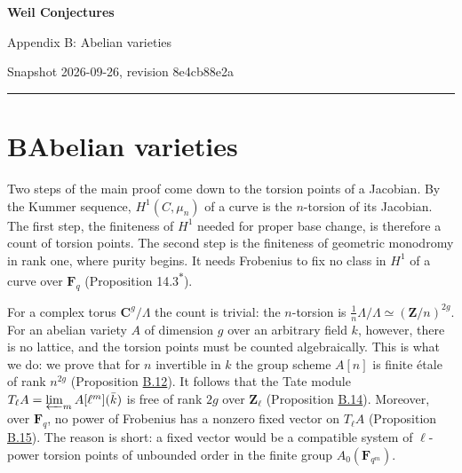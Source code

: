 \documentclass[11pt]{article}
\newcommand{\bpout}[1]{#1\textsuperscript{\hyperlink{bp-outside}{\ensuremath{\ast}}}}
\begin{document}
\pagestyle{plain}
\begin{center}
{\LARGE\bfseries Weil Conjectures\par}
\vspace{0.7em}
{\large Appendix B: Abelian varieties\par}
\vspace{0.5em}
{\small\color{bpmuted}Snapshot 2026-09-26, revision 8e4cb88e2a\par}
\end{center}
\vspace{0.5em}
{\small\tableofcontents}
\bigskip\hrule\bigskip

\section*{\texorpdfstring{B\quad Abelian varieties}{B Abelian varieties}}
\label{bp1}%
\label{bp2}%
Two steps of the main proof come down to the torsion points of a Jacobian. By the Kummer sequence, \(H^1(C,\mu_n)\) of a curve is the \(n\)-torsion of its Jacobian. The first step, the finiteness of \(H^1\) needed for proper base change, is therefore a count of torsion points. The second step is the finiteness of geometric monodromy in rank one, where purity begins. It needs Frobenius to fix no class in \(H^1\) of a curve over \(\mathbf F_q\) (Proposition \bpout{14.3}).

For a complex torus \(\mathbf C^g/\Lambda\) the count is trivial: the \(n\)-torsion is \(\tfrac1n\Lambda/\Lambda\simeq(\mathbf Z/n)^{2g}\). For an abelian variety \(A\) of dimension \(g\) over an arbitrary field \(k\), however, there is no lattice, and the torsion points must be counted algebraically. This is what we do: we prove that for \(n\) invertible in \(k\) the group scheme \(A[n]\) is finite étale of rank \(n^{2g}\) (Proposition \hyperref[bp34]{B.12}). It follows that the Tate module \(T_\ell A=\varprojlim_mA[\ell^m](\bar k)\) is free of rank \(2g\) over \(\mathbf Z_\ell\) (Proposition \hyperref[bp40]{B.14}). Moreover, over \(\mathbf F_q\), no power of Frobenius has a nonzero fixed vector on \(T_\ell A\) (Proposition \hyperref[bp43]{B.15}). The reason is short: a fixed vector would be a compatible system of \(\ell\)-power torsion points of unbounded order in the finite group \(A_0(\mathbf F_{q^m})\).
\end{document}
